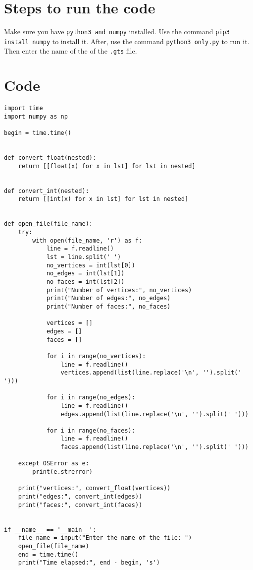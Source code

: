 \documentclass[11pt]{article}
\begin{document}
\section{Steps to run the code}
Make sure you have \ttfamily \texttt{python3 and numpy} \normalfont installed. 
Use the command \ttfamily \texttt{pip3 install numpy} \normalfont to install it.
After, use the command \ttfamily \texttt{python3 only.py} \normalfont to run it. Then enter the name of the of the \ttfamily \texttt{.gts} \normalfont file.

\section{Code}
\begin{verbatim}
import time
import numpy as np

begin = time.time()


def convert_float(nested):
    return [[float(x) for x in lst] for lst in nested]


def convert_int(nested):
    return [[int(x) for x in lst] for lst in nested]


def open_file(file_name):
    try:
        with open(file_name, 'r') as f:
            line = f.readline()
            lst = line.split(' ')
            no_vertices = int(lst[0])
            no_edges = int(lst[1])
            no_faces = int(lst[2])
            print("Number of vertices:", no_vertices)
            print("Number of edges:", no_edges)
            print("Number of faces:", no_faces)

            vertices = []
            edges = []
            faces = []

            for i in range(no_vertices):
                line = f.readline()
                vertices.append(list(line.replace('\n', '').split(' ')))

            for i in range(no_edges):
                line = f.readline()
                edges.append(list(line.replace('\n', '').split(' ')))

            for i in range(no_faces):
                line = f.readline()
                faces.append(list(line.replace('\n', '').split(' ')))

    except OSError as e:
        print(e.strerror)

    print("vertices:", convert_float(vertices))
    print("edges:", convert_int(edges))
    print("faces:", convert_int(faces))


if __name__ == '__main__':
    file_name = input("Enter the name of the file: ")
    open_file(file_name)
    end = time.time()
    print("Time elapsed:", end - begin, 's')

\end{verbatim}
\end{document}
